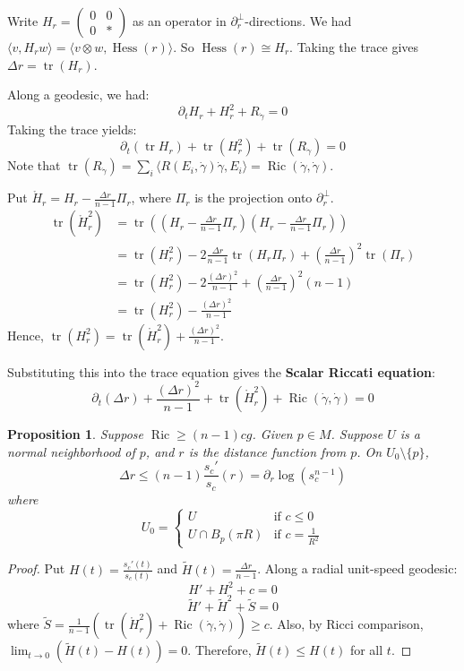 \documentclass[11pt, a4paper]{article}
\theoremstyle{plain}
\newtheorem{proposition}[theorem]{Proposition}
\theoremstyle{definition}
\theoremstyle{remark}
\DeclareMathOperator{\tr}{tr}
\DeclareMathOperator{\Ric}{Ric}
\DeclareMathOperator{\Hess}{Hess}
\begin{document}
{Write $H_r = \begin{pmatrix} 0 & 0 \\ 0 & * \end{pmatrix}$ as an operator in $\partial_r^\perp$-directions.
We had $\langle v, H_r w \rangle = \langle v \otimes w, \Hess(r) \rangle$. So $\Hess(r) \cong H_r$. Taking the trace gives $\Delta r = \tr(H_r)$.

Along a geodesic, we had:
\[ \partial_t H_r + H_r^2 + R_{\dot{\gamma}} = 0 \]
Taking the trace yields:
\[ \partial_t (\tr H_r) + \tr(H_r^2) + \tr(R_{\dot{\gamma}}) = 0 \]
Note that $\tr(R_{\dot{\gamma}}) = \sum_i \langle R(E_i, \dot{\gamma})\dot{\gamma}, E_i \rangle = \Ric(\dot{\gamma}, \dot{\gamma})$.

Put $\mathring{H}_r = H_r - \frac{\Delta r}{n-1} \Pi_r$, where $\Pi_r$ is the projection onto $\partial_r^\perp$.
\begin{align*}
\tr(\mathring{H}_r^2) &= \tr\left( \left(H_r - \frac{\Delta r}{n-1} \Pi_r\right) \left(H_r - \frac{\Delta r}{n-1} \Pi_r\right) \right) \\
&= \tr(H_r^2) - 2 \frac{\Delta r}{n-1} \tr(H_r \Pi_r) + \left(\frac{\Delta r}{n-1}\right)^2 \tr(\Pi_r) \\
&= \tr(H_r^2) - 2 \frac{(\Delta r)^2}{n-1} + \left(\frac{\Delta r}{n-1}\right)^2 (n-1) \\
&= \tr(H_r^2) - \frac{(\Delta r)^2}{n-1}
\end{align*}
Hence, $\tr(H_r^2) = \tr(\mathring{H}_r^2) + \frac{(\Delta r)^2}{n-1}$.

Substituting this into the trace equation gives the \textbf{Scalar Riccati equation}:
\[ \partial_t(\Delta r) + \frac{(\Delta r)^2}{n-1} + \tr(\mathring{H}_r^2) + \Ric(\dot{\gamma}, \dot{\gamma}) = 0 \]

\begin{proposition}
Suppose $\Ric \ge (n-1)cg$. Given $p \in M$. Suppose $U$ is a normal neighborhood of $p$, and $r$ is the distance function from $p$. On $U_0 \setminus \{p\}$, 
\[ \Delta r \le (n-1) \frac{s_c'}{s_c}(r) = \partial_r \log(s_c^{n-1}) \]
where 
\[ U_0 = \begin{cases} 
U & \text{if } c \le 0 \\ 
U \cap B_p(\pi R) & \text{if } c = \frac{1}{R^2} 
\end{cases} \]
\end{proposition}

\begin{proof}
Put $H(t) = \frac{s_c'(t)}{s_c(t)}$ and $\tilde{H}(t) = \frac{\Delta r}{n-1}$. Along a radial unit-speed geodesic:
\[ H' + H^2 + c = 0 \]
\[ \tilde{H}' + \tilde{H}^2 + \tilde{S} = 0 \]
where $\tilde{S} = \frac{1}{n-1} (\tr(\mathring{H}_r^2) + \Ric(\dot{\gamma}, \dot{\gamma})) \ge c$.
Also, by Ricci comparison, $\lim_{t \to 0} (\tilde{H}(t) - H(t)) = 0$. Therefore, $\tilde{H}(t) \le H(t)$ for all $t$.
\end{proof}

}
\end{document}
